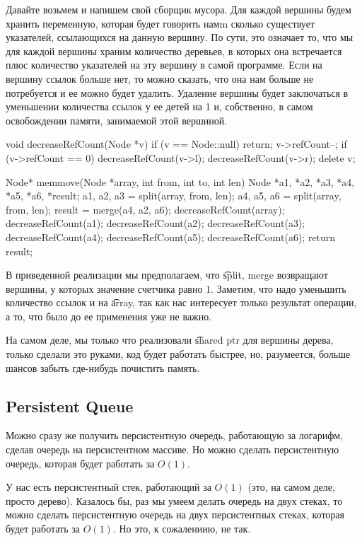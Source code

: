 Давайте возьмем и напишем свой сборщик мусора. Для каждой вершины будем хранить переменную,
которая будет говорить намm сколько существует указателей, ссылающихся на данную вершину.
По сути, это означает то, что мы для каждой вершины храним количество деревьев, 
в которых она встречается плюс количество указателей на эту вершину в самой программе.
Если на вершину ссылок больше нет, то можно сказать, что она нам больше не потребуется
и ее можно будет удалить. 
Удаление вершины будет заключаться в уменьшении количества ссылок у
ее детей на 1 и, собственно, в самом освобождении памяти, занимаемой этой вершиной.

\begin{cppcode}
void decreaseRefCount(Node *v) {
	if (v == Node::null)
		return;
	v->refCount--;
	if (v->refCount == 0) {
		decreaseRefCount(v->l);
		decreaseRefCount(v->r);
		delete v;
	}	 
}

Node* memmove(Node *array, int from, int to, int len) {
	Node *a1, *a2, *a3, *a4, *a5, *a6, *result;
	a1, a2, a3 = split(array, from, len);
	a4, a5, a6 = split(array, from, len);
	result = merge(a4, a2, a6);
	decreaseRefCount(array);
	decreaseRefCount(a1);
	decreaseRefCount(a2);
	decreaseRefCount(a3);
	decreaseRefCount(a4);
	decreaseRefCount(a5);
	decreaseRefCount(a6);
	return result;		 
}
\end{cppcode}

В приведенной реализации мы предполагаем, что \t{split, merge} возвращают вершины, 
у которых значение счетчика равно 1. Заметим, что надо уменьшить количество ссылок и на
\t{array}, так как нас интересует только результат операции, а то, что было до ее применения
уже не важно. 

\begin{Rem}
На самом деле, мы только что реализовали \t{shared ptr} для вершины дерева, только сделали это руками,
код будет работать быстрее, но, разумеется, больше шансов забыть где-нибудь почистить память.
\end{Rem}

\subsection{Persistent Queue}

Можно сразу же получить персистентную очередь, работающую за логарифм, сделав очередь на
персистентном массиве. 
Но можно сделать персистентную очередь, которая будет работать за $O(1)$. 

У нас есть персистентный стек, работающий за $O(1)$ (это, на самом деле, просто дерево).
Казалось бы, раз мы умеем делать очередь на двух стеках, то можно сделать персистентную очередь
на двух персистентных стеках, которая будет работать за $O(1)$. 
Но это, к сожалениию, не так.

